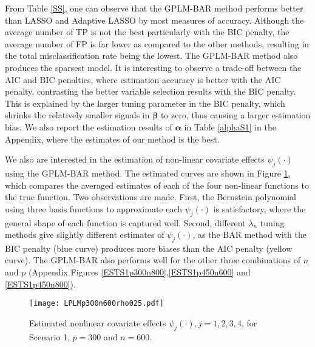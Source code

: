 \documentclass[11pt]{article}
\begin{document}
From Table \ref{SS}, one can observe that the GPLM-BAR method performs better than LASSO and Adaptive LASSO by most measures of accuracy. Although the average number of TP is not the best particularly with the BIC penalty, the average number of FP is far lower as compared to the other methods, resulting in the total misclassification rate being the lowest. The GPLM-BAR method also produces the sparsest model. It is interesting to observe a trade-off between the AIC and BIC penalties, where estimation accuracy is better with the AIC penalty, contrasting the better variable selection results with the BIC penalty. This is explained by the larger tuning parameter in the BIC penalty, which shrinks the relatively smaller signals in $\boldsymbol{\beta}$ to zero, thus causing a larger estimation bias. We also report the estimation results of $\boldsymbol{\alpha}$ in Table \ref{alphaS1} in the Appendix, where the estimates of our method is the best.

We also are interested in the estimation of non-linear covariate effects $\psi_j(\cdot)$ using the GPLM-BAR method. The estimated curves are shown in Figure \ref{nonlinES}, which compares the averaged estimates of each of the four non-linear functions to the true function. Two observations are made. First, the Bernstein polynomial using three basis functions to approximate each $\psi_j(\cdot)$ is satisfactory, where the general shape of each function is captured well. Second, different $\lambda_n$ tuning  methods give slightly different estimates of $\psi_j(\cdot)$, as the BAR method with the BIC penalty (blue curve) produces more biases than the AIC penalty (yellow curve). The GPLM-BAR also performs well for the other three combinations of $n$ and $p$ (Appendix Figures \ref{ESTS1p300n800},\ref{ESTS1p450n600} and \ref{ESTS1p450n800}).
\begin{figure}
\centering
\centerline{\texttt{[image: LPLMp300n600rho025.pdf]}}
\caption{Estimated nonlinear covariate effects $\psi_j(\cdot), j=1,2,3,4$, for Scenario 1, $p=300$ and $n=600$.} \label{nonlinES}
\end{figure}
\end{document}
